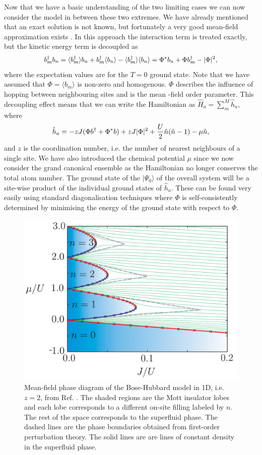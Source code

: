 Now that we have a basic understanding of the two limiting cases we
can now consider the model in between these two extremes. We have
already mentioned that an exact solution is not known, but fortunately
a very good mean-field approximation exists \cite{fisher1989}. In this
approach the interaction term is treated exactly, but the kinetic
energy term is decoupled as
\begin{equation}
  b^\dagger_m b_n = \langle b^\dagger_m \rangle b_n + b^\dagger_m \langle b_n \rangle -
  \langle b^\dagger_m \rangle \langle b_n \rangle = \Phi^* b_n + \Phi b^\dagger_m
  - | \Phi |^2,
\end{equation}
where the expectation values are for the $T = 0$ ground state. Note
that we have assumed that $\Phi = \langle b_m \rangle $ is non-zero
and homogenous. $\Phi$ describes the influence of hopping between
neighbouring sites and is the mean -field order parameter. This
decoupling effect means that we can write the Hamiltonian as $\hat{H}_a
= \sum_m^M \hat{h}_a$, where
\begin{equation}
  \hat{h}_a = -z J ( \Phi b^\dagger + \Phi^* b) + z J | \Phi |^2 + \frac{U}{2}
  \hat{n} (\hat{n} - 1) - \mu \hat{n},
\end{equation}
and $z$ is the coordination number, i.e. the number of nearest
neighbours of a single site. We have also introduced the chemical
potential $\mu$ since we now consider the grand canonical ensemble as
the Hamiltonian no longer conserves the total atom number. The ground
state of the $| \Psi_0 \rangle$ of the overall system will be a
site-wise product of the individual ground states of
$\hat{h}_a$. These can be found very easily using standard
diagonalisation techniques where $\Phi$ is self-consistently
determined by minimising the energy of the ground state with respect
to $\Phi$.

\begin{figure}
  \centering
  \includegraphics[width=0.8\linewidth]{BHPhase}
  \caption[Mean-Field Bose-Hubbard Phase Diagram]{Mean-field phase
    diagram of the Bose-Hubbard model in 1D, i.e.~ $z = 2$, from
    Ref. \cite{StephenThesis}. The shaded regions are the Mott
    insulator lobes and each lobe corresponds to a different on-site
    filling labeled by $n$. The rest of the space corresponds to the
    superfluid phase. The dashed lines are the phase boundaries
    obtained from first-order perturbation theory. The solid lines are
    are lines of constant density in the superfluid
    phase. \label{fig:BHPhase}}
\end{figure}

